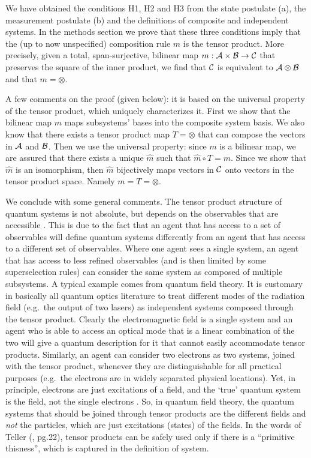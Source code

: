 \documentclass[aps,prl,amsmath,amssymb,twocolumn,nofootinbib]{revtex4}
\theoremstyle{plain}
\theoremstyle{definition}
\theoremstyle{remark}
\begin{document}
We have obtained the conditions H1, H2 and H3 from the state postulate
(a), the measurement postulate (b) and the definitions of composite
and independent systems. In the methods section we prove that these
three conditions imply that the (up to now unspecified) composition
rule $m$ is the tensor product. More precisely, given a total,
span-surjective, bilinear map $m:{\cal A}\times{\cal B}\to{\cal C}$
that preserves the square of the inner product, we find that $\cal C $
is equivalent to $\cal A \otimes \cal B $ and that $m=\otimes$.
  

A few comments on the proof (given below): it is based on the universal
property of the tensor product, which uniquely characterizes it. First
we show that the bilinear map $m$ maps subsystems' bases into the
composite system basis. We also know that there exists a tensor
product map $ {T}=\otimes$ that can compose the vectors in $\cal A$
and $\cal B$.  Then we use the universal property: since $m$ is a
bilinear map, we are assured that there exists a unique $\hat m$ such
that $\hat m \circ T=m$. Since we show that $\hat m$ is an
isomorphism, then $\hat{m}$ bijectively maps vectors in $\cal C$ onto
vectors in the tensor product space. Namely $m={T}=\otimes$.

We conclude with some general comments. The tensor product structure
of quantum systems is not absolute, but depends on the observables
that are accessible \cite{zanardi,zanardilloyd}. This is due to the
fact that an agent that has access to a set of observables will define
quantum systems differently from an agent that has access to a
different set of observables. Where one agent sees a single system, an
agent that has access to less refined observables (and is then limited
by some superselection rules) can consider the same system as composed
of multiple subsystems. A typical example \cite{tellerbook} comes from
quantum field theory. It is customary in basically all quantum optics
literature to treat different modes of the radiation field (e.g.~the
output of two lasers) as independent systems composed through the
tensor product.  Clearly the electromagnetic field is a single system
and an agent who is able to access an optical mode that is a linear
combination of the two will give a quantum description for it that
cannot easily accommodate tensor products. Similarly, an agent can
consider two electrons as two systems, joined with the tensor product,
whenever they are distinguishable for all practical purposes (e.g.~the
electrons are in widely separated physical locations). Yet, in
principle, electrons are just excitations of a field, and the `true'
quantum system is the field, not the single electrons
\cite{teller,tellerbook}.  So, in quantum field theory, the quantum
systems that should be joined through tensor products are the
different fields and {\em not} the particles, which are just
excitations (states) of the fields. In the words of Teller
(\cite{tellerbook}, pg.22), tensor products can be safely used only if
there is a ``primitive thisness'', which is captured in the definition
of system.
\end{document}
